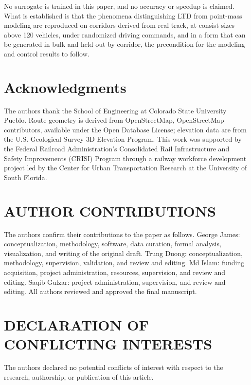 \documentclass[numbered]{trbunofficial}
\begin{document}
No surrogate is trained in this paper, and no accuracy or speedup is claimed. What is established is that the phenomena distinguishing LTD from point-mass modeling are reproduced on corridors derived from real track, at consist sizes above 120 vehicles, under randomized driving commands, and in a form that can be generated in bulk and held out by corridor, the precondition for the modeling and control results to follow.

\section{Acknowledgments}

The authors thank the School of Engineering at Colorado State University Pueblo. Route geometry is derived from OpenStreetMap, \textcopyright{} OpenStreetMap contributors, available under the Open Database License; elevation data are from the U.S. Geological Survey 3D Elevation Program. This work was supported by the Federal Railroad Administration's Consolidated Rail Infrastructure and Safety Improvements (CRISI) Program through a railway workforce development project led by the Center for Urban Transportation Research at the University of South Florida.

\section*{AUTHOR CONTRIBUTIONS}
The authors confirm their contributions to the paper as follows. George James: conceptualization, methodology, software, data curation, formal analysis, visualization, and writing of the original draft. Trung Duong: conceptualization, methodology, supervision, validation, and review and editing. Md Islam: funding acquisition, project administration, resources, supervision, and review and editing. Saqib Gulzar: project administration, supervision, and review and editing. All authors reviewed and approved the final manuscript.

\section*{DECLARATION OF CONFLICTING INTERESTS}
The authors declared no potential conflicts of interest with respect to the research, authorship, or publication of this article.



\end{document}
